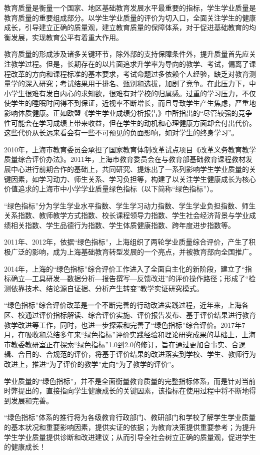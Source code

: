 \vspace{10mm}
\vspace{5mm}

\myprefacetext

教育质量是衡量一个国家、地区基础教育发展水平最重要的指标，学生学业质量是教育质量的重要组成部分。以学生学业质量的评价为切入口，全面关注学生的健康成长，引导建立正确的质量观，建立教育质量的保障体系，对于促进基础教育的均衡发展，实现教育公平有着重大作用。

教育质量的形成涉及诸多关键环节，除外部的支持保障条件外，提升质量首先应关注教学过程。但是，长期存在的以片面追求升学率为导向的教学、考试，偏离了课程改革的方向和课程标准的基本要求，考试命题过多依赖个人经验，缺乏对教育测量学的深入研究；考试结果用于排名、甄别和选拔，加剧了竞争。在此压力下，中小学生很难有发自内心的求知欲，很难有对学校的归属感。过重的学习压力，不仅使学生的睡眠时间得不到保证，近视率不断增长，而且导致学生产生焦虑，严重地影响体质健康。正如欧盟《学生学业成绩分析报告》中所指出的“尽管较强的竞争性可能会在学习成绩上带来收益，但在学生的动机和心理健康方面却会付出代价。这些代价从长远来看会有一些不可预见的负面影响，如对学生的终身学习”。

2010年，上海市教育委员会承担了国家教育体制改革试点项目《改革义务教育教学质量综合评价办法》。2011年，上海市教育委员会在与教育部基础教育课程教材发展中心进行前期合作的基础上，共同研究、提炼出了一系列影响学生学业质量的关键因素，如学习动力、师生关系、学习负担等，构建了以关注学生健康成长为核心价值追求的上海市中小学学业质量绿色指标（以下简称“绿色指标”）。


“绿色指标”分为学生学业水平指数、学生学习动力指数、学生学业负担指数、师生关系指数、教师教学方式指数、校长课程领导力指数、学生社会经济背景与学业成绩相关指数、学生品德行为指数、学生体质健康指数、跨年度进步指数等。


2011年、2012年，依据“绿色指标”，上海组织了两轮学业质量综合评价，产生了积极广泛的影响，成为上海基础教育转型发展的一个亮点，并被教育部向全国推广。


2014年，上海的“绿色指标”综合评价工作进入了全面自主化的新阶段，建立了“指标确立—工具研发—数据分析—报告撰写—反馈改进”的评价操作路径；形成了“检测依靠技术、结论源自证据、分析产生转变”教学实证研究模式。


“绿色指标”综合评价改革是一个不断完善的行动改进实践过程，近年来，上海各区、校通过评价指标解读、综合评价实施、评价报告发布、基于评价结果进行教育教学改进等工作，同时，也进一步探索和完善了“绿色指标”综合评价。2017年7月，在吸收和总结多年来“绿色指标”评价实践经验和理论研究成果的基础上，上海市教委教研室正在探索“绿色指标”1.0到2.0的修订，旨在通过更加合事实、合逻辑、合目的、合规范的评价，将基于评价结果的改进落实到学校、学生、教师行为改进上，推进“为了评价的教学”走向“为了教学的评价”。


学业质量的“绿色指标”，并不是全面衡量教育质量的完整指标体系，而是针对当前时弊提出的，直接指向学生健康成长的关键因素，该指标在使用过程中将不断地得到发展和完善。


“绿色指标”体系的推行将为各级教育行政部门、教研部门和学校了解学生学业质量的基本状况和重要影响因素，提供实证的依据；为教育决策提供重要参考；为提升学生学业质量提供诊断和改进建议；从而引导全社会树立正确的质量观，促进学生的健康成长！

\clearpage
